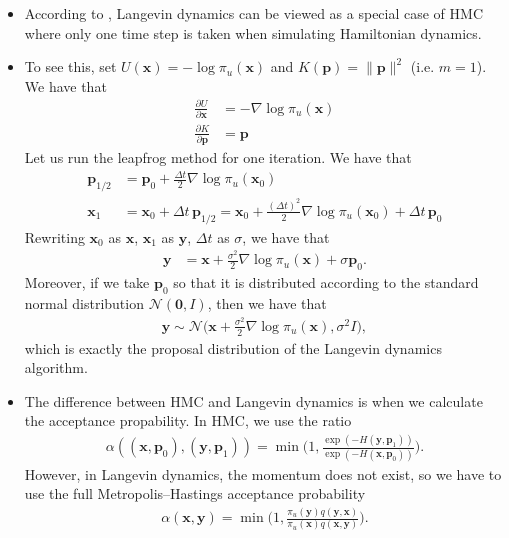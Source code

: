 \documentclass[10pt]{article}
\newcommand{\ve}[1]{\mathbf{#1}}
\newcommand{\mcal}[1]{\mathcal{#1}}
\begin{document}
\begin{itemize}
  \item According to \cite{Neal:2011}, Langevin dynamics can be viewed as a special case of HMC where only one time step is taken when simulating Hamiltonian dynamics.
  
  \item To see this, set $U(\ve{x}) = - \log \pi_u(\ve{x})$ and $K(\ve{p}) = \|\ve{p}\|^2$ (i.e. $m = 1$). We have that
  \begin{align*}
    \frac{\partial U}{\partial \ve{x}} &= -\nabla \log \pi_u(\ve{x}) \\
    \frac{\partial K}{\partial \ve{p}} &= \ve{p}
  \end{align*}
  Let us run the leapfrog method for one iteration. We have that
  \begin{align*}
    \ve{p}_{1/2} &= \ve{p}_0 + \frac{\Delta t}{2} \nabla \log \pi_u(\ve{x}_0) \\
    \ve{x}_1 &= \ve{x}_0 + \Delta t\, \ve{p}_{1/2} = \ve{x}_0 + \frac{(\Delta t)^2}{2} \nabla \log \pi_u(\ve{x}_0) + \Delta t\, \ve{p}_0
  \end{align*}
  Rewriting $\ve{x}_0$ as $\ve{x}$, $\ve{x}_1$ as $\ve{y}$, $\Delta t$ as $\sigma$, we have that
  \begin{align} \label{eqn:hmc-one-step}
    \ve{y} &= \ve{x} + \frac{\sigma^2}{2} \nabla \log \pi_u(\ve{x}) + \sigma \ve{p}_0.
  \end{align}
  Moreover, if we take $\ve{p}_0$ so that it is distributed according to the standard normal distribution $\mcal{N}(\ve{0}, I)$, then we have that
  \begin{align*}
    \ve{y} \sim \mcal{N}\bigg( \ve{x} + \frac{\sigma^2}{2} \nabla \log \pi_u(\ve{x}), \sigma^2 I \bigg),
  \end{align*}
  which is exactly the proposal distribution of the Langevin dynamics algorithm.

  \item The difference between HMC and Langevin dynamics is when we calculate the acceptance propability. In HMC, we use the ratio 
  \begin{align*}
    \alpha((\ve{x},\ve{p}_0), (\ve{y},\ve{p}_1)) = \min\bigg(1, \frac{\exp(-H(\ve{y},\ve{p}_1))}{\exp(-H(\ve{x},\ve{p}_0))} \bigg).
  \end{align*}
  However, in Langevin dynamics, the momentum does not exist, so we have to use the full Metropolis--Hastings acceptance probability
  \begin{align*}
    \alpha(\ve{x},\ve{y}) = \min\bigg( 1, \frac{\pi_u(\ve{y}) q(\ve{y},\ve{x}) }{\pi_u(\ve{x}) q(\ve{x},\ve{y})} \bigg).
  \end{align*}
\end{itemize}
\end{document}
